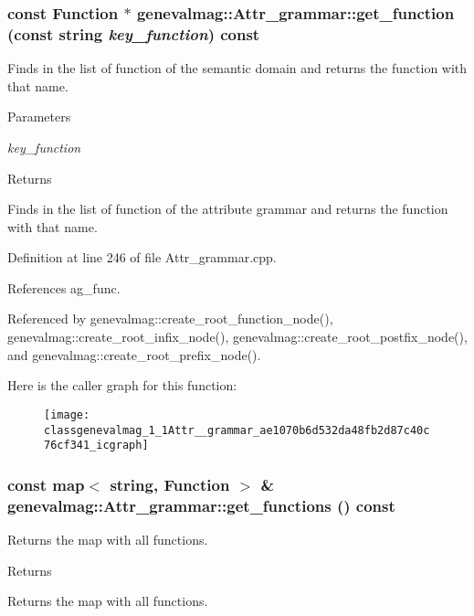 \hypertarget{classgenevalmag_1_1Attr__grammar_ae1070b6d532da48fb2d87c40c76cf341}{
\subsubsection[{get\_\-function}]{\setlength{\rightskip}{0pt plus 5cm}const {\bf Function} $\ast$ genevalmag::Attr\_\-grammar::get\_\-function (const string {\em key\_\-function}) const}}
\label{classgenevalmag_1_1Attr__grammar_ae1070b6d532da48fb2d87c40c76cf341}
Finds in the list of function of the semantic domain and returns the function with that name. 
\begin{DoxyParams}{Parameters}
\item[{\em key\_\-function}]\end{DoxyParams}
\begin{DoxyReturn}{Returns}

\end{DoxyReturn}
Finds in the list of function of the attribute grammar and returns the function with that name. 

Definition at line 246 of file Attr\_\-grammar.cpp.



References ag\_\-func.



Referenced by genevalmag::create\_\-root\_\-function\_\-node(), genevalmag::create\_\-root\_\-infix\_\-node(), genevalmag::create\_\-root\_\-postfix\_\-node(), and genevalmag::create\_\-root\_\-prefix\_\-node().



Here is the caller graph for this function:\nopagebreak
\begin{figure}[H]
\begin{center}
\leavevmode
\texttt{[image: classgenevalmag\_1\_1Attr\_\_grammar\_ae1070b6d532da48fb2d87c40c76cf341\_icgraph]}
\end{center}
\end{figure}


\hypertarget{classgenevalmag_1_1Attr__grammar_ae9743e35703d55c1d9594d7061340b9b}{
\subsubsection[{get\_\-functions}]{\setlength{\rightskip}{0pt plus 5cm}const map$<$ string, {\bf Function} $>$ \& genevalmag::Attr\_\-grammar::get\_\-functions () const}}
\label{classgenevalmag_1_1Attr__grammar_ae9743e35703d55c1d9594d7061340b9b}
Returns the map with all functions. \begin{DoxyReturn}{Returns}

\end{DoxyReturn}
Returns the map with all functions. 

